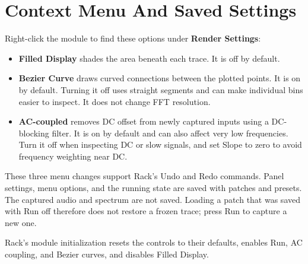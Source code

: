 \section{Context Menu And Saved Settings}\label{sec:settings}

Right-click the module to find these options under \textbf{Render Settings}:
\begin{itemize}
  \item \textbf{Filled Display} shades the area beneath each trace. It is
  off by default.
  \item \textbf{Bezier Curve} draws curved connections between the plotted
  points. It is on by default. Turning it off uses straight segments and can
  make individual bins easier to inspect. It does not change FFT resolution.
  \item \textbf{AC-coupled} removes DC offset from newly captured inputs
  using a DC-blocking filter. It is on by default and can also affect very
  low frequencies. Turn it off when inspecting DC or slow signals, and set
  Slope to zero to avoid frequency weighting near DC.
\end{itemize}

These three menu changes support Rack's Undo and Redo commands. Panel
settings, menu options, and the running state are saved with patches and
presets. The captured audio and spectrum are not saved. Loading a patch
that was saved with Run off therefore does not restore a frozen trace;
press Run to capture a new one.

Rack's module initialization resets the controls to their defaults, enables
Run, AC coupling, and Bezier curves, and disables Filled Display.
